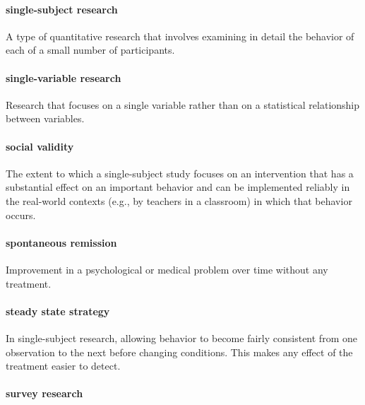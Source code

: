 \documentclass[
]{krantz}
\begin{document}
\paragraph*{single-subject research}\label{single-subject-research-1}

A type of quantitative research that involves examining in detail the behavior of each of a small number of participants.

\paragraph*{single-variable research}\label{single-variable-research}

Research that focuses on a single variable rather than on a statistical relationship between variables.

\paragraph*{social validity}\label{social-validity}

The extent to which a single-subject study focuses on an intervention that has a substantial effect on an important behavior and can be implemented reliably in the real-world contexts (e.g., by teachers in a classroom) in which that behavior occurs.

\paragraph*{spontaneous remission}\label{spontaneous-remission}

Improvement in a psychological or medical problem over time without any treatment.

\paragraph*{steady state strategy}\label{steady-state-strategy}

In single-subject research, allowing behavior to become fairly consistent from one observation to the next before changing conditions. This makes any effect of the treatment easier to detect.

\paragraph*{survey research}\label{survey-research}
\end{document}
